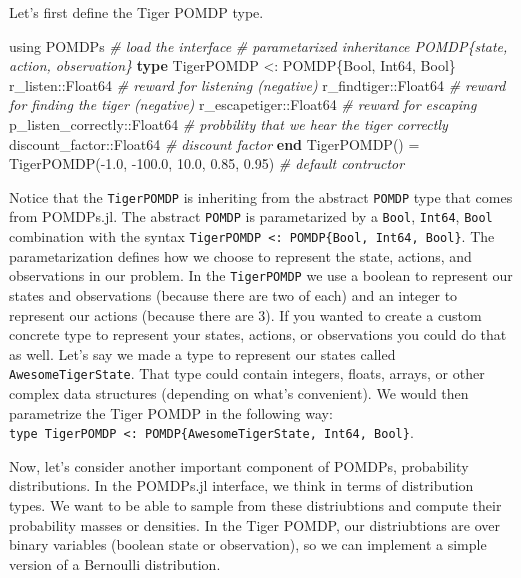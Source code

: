 \documentclass[12pt,]{article}
\newenvironment{Shaded}{}{}
\newcommand{\KeywordTok}[1]{\textcolor[rgb]{0.00,0.44,0.13}{\textbf{{#1}}}}
\newcommand{\DataTypeTok}[1]{\textcolor[rgb]{0.56,0.13,0.00}{{#1}}}
\newcommand{\FloatTok}[1]{\textcolor[rgb]{0.25,0.63,0.44}{{#1}}}
\newcommand{\CommentTok}[1]{\textcolor[rgb]{0.38,0.63,0.69}{\textit{{#1}}}}
\newcommand{\NormalTok}[1]{{#1}}
\begin{document}
Let's first define the Tiger POMDP type.

\begin{Shaded}
\begin{Highlighting}[]
\NormalTok{using POMDPs }\CommentTok{# load the interface}
\CommentTok{# parametarized inheritance POMDP\{state, action, observation\}}
\KeywordTok{type} \NormalTok{TigerPOMDP <: POMDP\{}\DataTypeTok{Bool}\NormalTok{, }\DataTypeTok{Int64}\NormalTok{, }\DataTypeTok{Bool}\NormalTok{\} }
    \NormalTok{r_listen::}\DataTypeTok{Float64} \CommentTok{# reward for listening (negative)}
    \NormalTok{r_findtiger::}\DataTypeTok{Float64} \CommentTok{# reward for finding the tiger (negative)}
    \NormalTok{r_escapetiger::}\DataTypeTok{Float64} \CommentTok{# reward for escaping}
    \NormalTok{p_listen_correctly::}\DataTypeTok{Float64} \CommentTok{# probbility that we hear the tiger correctly}
    \NormalTok{discount_factor::}\DataTypeTok{Float64} \CommentTok{# discount factor}
\KeywordTok{end}
\NormalTok{TigerPOMDP() = TigerPOMDP(-}\FloatTok{1.0}\NormalTok{, -}\FloatTok{100.0}\NormalTok{, }\FloatTok{10.0}\NormalTok{, }\FloatTok{0.85}\NormalTok{, }\FloatTok{0.95}\NormalTok{) }\CommentTok{# default contructor}
\end{Highlighting}
\end{Shaded}

Notice that the \texttt{TigerPOMDP} is inheriting from the abstract
\texttt{POMDP} type that comes from POMDPs.jl. The abstract
\texttt{POMDP} is parametarized by a \texttt{Bool}, \texttt{Int64},
\texttt{Bool} combination with the syntax
\texttt{TigerPOMDP\ \textless{}:\ POMDP\{Bool,\ Int64,\ Bool\}}. The
parametarization defines how we choose to represent the state, actions,
and observations in our problem. In the \texttt{TigerPOMDP} we use a
boolean to represent our states and observations (because there are two
of each) and an integer to represent our actions (because there are 3).
If you wanted to create a custom concrete type to represent your states,
actions, or observations you could do that as well. Let's say we made a
type to represent our states called \texttt{AwesomeTigerState}. That
type could contain integers, floats, arrays, or other complex data
structures (depending on what's convenient). We would then parametrize
the Tiger POMDP in the following way:
\texttt{type\ TigerPOMDP\ \textless{}:\ POMDP\{AwesomeTigerState,\ Int64,\ Bool\}}.

Now, let's consider another important component of POMDPs, probability
distributions. In the POMDPs.jl interface, we think in terms of
distribution types. We want to be able to sample from these
distriubtions and compute their probability masses or densities. In the
Tiger POMDP, our distriubtions are over binary variables (boolean state
or observation), so we can implement a simple version of a Bernoulli
distribution.
\end{document}
